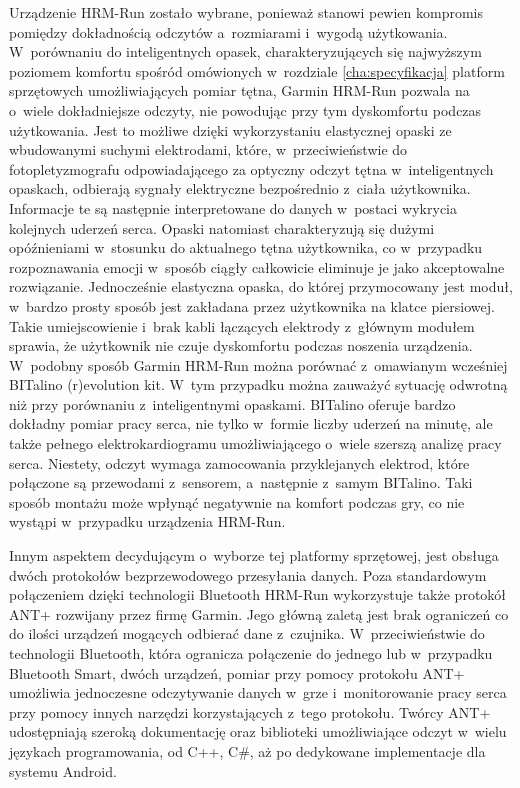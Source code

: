 Urządzenie HRM-Run zostało wybrane, ponieważ stanowi pewien kompromis pomiędzy dokładnością odczytów a~rozmiarami i~wygodą użytkowania. W~porównaniu do inteligentnych opasek, charakteryzujących się najwyższym poziomem komfortu spośród omówionych w~rozdziale \ref{cha:specyfikacja} platform sprzętowych umożliwiających pomiar tętna, Garmin HRM-Run pozwala na o~wiele dokładniejsze odczyty, nie powodując przy tym dyskomfortu podczas użytkowania. Jest to możliwe dzięki wykorzystaniu elastycznej opaski ze wbudowanymi suchymi elektrodami, które, w~przeciwieństwie do fotopletyzmografu odpowiadającego za optyczny odczyt tętna w~inteligentnych opaskach, odbierają sygnały elektryczne bezpośrednio z~ciała użytkownika. Informacje te są następnie interpretowane do danych w~postaci wykrycia kolejnych uderzeń serca. Opaski natomiast charakteryzują się dużymi opóźnieniami w~stosunku do aktualnego tętna użytkownika, co w~przypadku rozpoznawania emocji w~sposób ciągły całkowicie eliminuje je jako akceptowalne rozwiązanie. Jednocześnie elastyczna opaska, do której przymocowany jest moduł, w~bardzo prosty sposób jest zakładana przez użytkownika na klatce piersiowej. Takie umiejscowienie i~brak kabli łączących elektrody z~głównym modułem sprawia, że użytkownik nie czuje dyskomfortu podczas noszenia urządzenia. W~podobny sposób Garmin HRM-Run można porównać z~omawianym wcześniej BITalino (r)evolution kit. W~tym przypadku można zauważyć sytuację odwrotną niż przy porównaniu z~inteligentnymi opaskami. BITalino oferuje bardzo dokładny pomiar pracy serca, nie tylko w~formie liczby uderzeń na minutę, ale także pełnego elektrokardiogramu umożliwiającego o~wiele szerszą analizę pracy serca. Niestety, odczyt wymaga zamocowania przyklejanych elektrod, które połączone są przewodami z~sensorem, a~następnie z~samym BITalino. Taki sposób montażu może wpłynąć negatywnie na komfort podczas gry, co nie wystąpi w~przypadku urządzenia HRM-Run.

Innym aspektem decydującym o~wyborze tej platformy sprzętowej, jest obsługa dwóch protokołów bezprzewodowego przesyłania danych. Poza standardowym połączeniem dzięki technologii Bluetooth HRM-Run wykorzystuje także protokół ANT+ rozwijany przez firmę Garmin. Jego główną zaletą jest brak ograniczeń co do ilości urządzeń mogących odbierać dane z~czujnika. W~przeciwieństwie do technologii Bluetooth, która ogranicza połączenie do jednego lub w~przypadku Bluetooth Smart, dwóch urządzeń, pomiar przy pomocy protokołu ANT+ umożliwia jednoczesne odczytywanie danych w~grze i~monitorowanie pracy serca przy pomocy innych narzędzi korzystających z~tego protokołu. Twórcy ANT+ udostępniają szeroką dokumentację oraz biblioteki umożliwiające odczyt w~wielu językach programowania, od C++, C\#, aż po dedykowane implementacje dla systemu Android.

